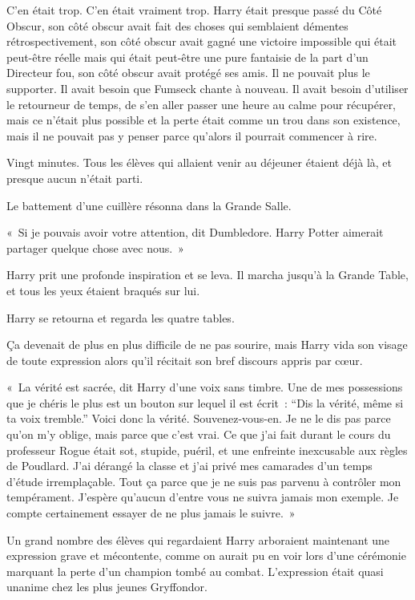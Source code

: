 C'en était trop.
C'en était vraiment trop.
Harry était presque passé du Côté Obscur, son côté obscur avait fait des choses qui semblaient démentes rétrospectivement, son côté obscur avait gagné une victoire impossible qui était peut-être réelle mais qui était peut-être une pure fantaisie de la part d'un Directeur fou, son côté obscur avait protégé ses amis.
Il ne pouvait plus le supporter.
Il avait besoin que Fumseck chante à nouveau.
Il avait besoin d'utiliser le retourneur de temps, de s'en aller passer une heure au calme pour récupérer, mais ce n'était plus possible et la perte était comme un trou dans son existence, mais il ne pouvait pas y penser parce qu'alors il pourrait commencer à rire.

Vingt minutes.
Tous les élèves qui allaient venir au déjeuner étaient déjà là, et presque aucun n'était parti.

Le battement d'une cuillère résonna dans la Grande Salle.

«~Si je pouvais avoir votre attention, dit Dumbledore.
Harry Potter aimerait partager quelque chose avec nous.~»

Harry prit une profonde inspiration et se leva.
Il marcha jusqu'à la Grande Table, et tous les yeux étaient braqués sur lui.

Harry se retourna et regarda les quatre tables.

Ça devenait de plus en plus difficile de ne pas sourire, mais Harry vida son visage de toute expression alors qu'il récitait son bref discours appris par cœur.

«~La vérité est sacrée, dit Harry d'une voix sans timbre.
Une de mes possessions que je chéris le plus est un bouton sur lequel il est écrit~: “Dis la vérité, même si ta voix tremble.” Voici donc la vérité.
Souvenez-vous-en.
Je ne le dis pas parce qu'on m'y oblige, mais parce que c'est vrai.
Ce que j'ai fait durant le cours du professeur Rogue était sot, stupide, puéril, et une enfreinte inexcusable aux règles de Poudlard.
J'ai dérangé la classe et j'ai privé mes camarades d'un temps d'étude irremplaçable.
Tout ça parce que je ne suis pas parvenu à contrôler mon tempérament.
J'espère qu'aucun d'entre vous ne suivra jamais mon exemple.
Je compte certainement essayer de ne plus jamais le suivre.~»

Un grand nombre des élèves qui regardaient Harry arboraient maintenant une expression grave et mécontente, comme on aurait pu en voir lors d'une cérémonie marquant la perte d'un champion tombé au combat.
L'expression était quasi unanime chez les plus jeunes Gryffondor.

